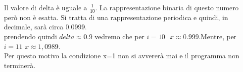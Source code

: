 
Il valore di delta è uguale a \(\frac{1}{10}\). La rappresentazione binaria di questo numero però non è esatta.
Si tratta di una rappresentazione periodica e quindi, in decimale, sarà circa 0.0999.\\
prendendo quindi $delta\approx0.9$ vedremo che per $i=10 \mbox{   }x\approx0.999$.Mentre, per $i=11$  $x\approx1,0989$.\\
Per questo motivo la condizione x=1 non si avvererà mai e il programma non terminerà.
